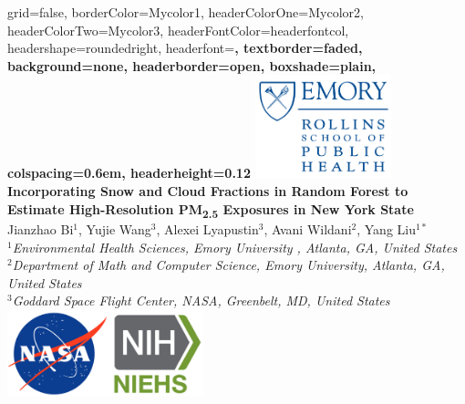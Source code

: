 \documentclass[a0paper,portrait]{baposter}
\newcommand{\tsub}{\textsubscript}
\begin{document}
\begin{poster}{
grid=false,
borderColor=Mycolor1, %
headerColorOne=Mycolor2, %
headerColorTwo=Mycolor3, %
headerFontColor=headerfontcol, %
headershape=roundedright, %
headerfont=\Large\sf\bf, %
textborder=faded,
background=none,
headerborder=open, %
boxshade=plain,
colspacing=0.6em,
headerheight=0.12\textheight
}
{\includegraphics[height=30mm]{rsph.png}}
%
%
{ \bf  \LARGE {Incorporating Snow and Cloud Fractions in Random Forest to Estimate High-Resolution PM\tsub{2.5} Exposures in New York State} }
{\vspace{0.3em} \smaller Jianzhao Bi$^1$, Yujie Wang$^3$, Alexei Lyapustin$^3$, Avani Wildani$^2$, Yang Liu$^{1\ast}$\\  %
\small $^1$\it {Environmental Health Sciences, Emory University , Atlanta, GA, United States} \\
\small $^2$\it {Department of Math and Computer Science, Emory University, Atlanta, GA, United States} \\
\small $^3$\it {Goddard Space Flight Center, NASA, Greenbelt, MD, United States}
}
{\includegraphics[height=25mm]{logo.png}} 


\end{poster}
\end{document}
